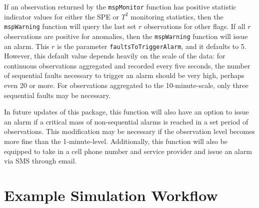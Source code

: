 \documentclass{report}\usepackage[]{graphicx}\usepackage[]{color}
\begin{document}
If an observation returned by the \texttt{mspMonitor} function has positive statistic indicator values for either the SPE or $T^2$ monitoring statistics, then the \texttt{mspWarning} function will query the last set $r$ observations for other flags. If all $r$ observations are positive for anomalies, then the \texttt{mspWarning} function will issue an alarm. This $r$ is the parameter \texttt{faultsToTriggerAlarm}, and it defaults to 5. However, this default value depends heavily on the scale of the data: for continuous observations aggregated and recorded every five seconds, the number of sequential faults necessary to trigger an alarm should be very high, perhaps even 20 or more. For observations aggregated to the 10-minute-scale, only three sequential faults may be necessary.

In future updates of this package, this function will also have an option to issue an alarm if a critical mass of non-sequential alarms is reached in a set period of observations. This modification may be necessary if the observation level becomes more fine than the 1-minute-level. Additionally, this function will also be equipped to take in a cell phone number and service provider and issue an alarm via SMS through email.




\section{Example Simulation Workflow}
\end{document}
